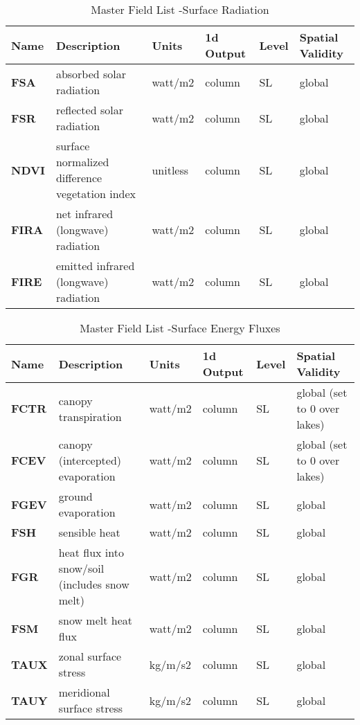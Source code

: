 \begin{longtable}{|l|p{2.3in}|l|l|l|p{1.0in}|} 
\caption{\label{master_field_list_srad} Master Field List -Surface Radiation} \\
\hline
\endhead
\hline
Name & Description & Units & 1d Output & Level & Spatial Validity  \\ 
\hline	\hline	

{\bf FSA} 
& absorbed solar radiation   
& watt/m2        
& column
& SL
& global \\ 
\hline

{\bf FSR} 
& reflected solar radiation   
& watt/m2        
& column  
& SL
& global \\ 
\hline

{\bf NDVI} 
& surface normalized difference vegetation index   
& unitless        
& column  
& SL
& global \\ 
\hline

{\bf FIRA} 
& net infrared (longwave) radiation   
& watt/m2      
& column  
& SL
& global \\ 
\hline

{\bf FIRE} 
& emitted infrared (longwave) radiation   
& watt/m2      
& column
& SL
& global \\ \hline

\end{longtable}
      
\begin{longtable}{|l|p{2.3in}|l|l|l|p{1.0in}|} 
\caption{\label{master_field_list_sflux} Master Field List -Surface Energy Fluxes} \\
\hline
\endhead
\hline
Name & Description & Units & 1d Output & Level & Spatial Validity  \\ 
\hline	\hline	

{\bf FCTR} 
& canopy transpiration   
& watt/m2      
& column  
& SL
& global (set to 0 over lakes) \\
\hline

{\bf FCEV} 
& canopy (intercepted) evaporation   
& watt/m2      
& column  
& SL
& global (set to 0 over lakes) \\
\hline

{\bf FGEV} 
& ground evaporation   
& watt/m2      
& column  
& SL
& global  \\
\hline

{\bf FSH} 
& sensible heat   
& watt/m2      
& column  
& SL
& global \\
\hline

{\bf FGR} 
& heat flux into snow/soil (includes snow melt)   
& watt/m2      
& column  
& SL
& global \\
\hline

{\bf FSM} 
& snow melt heat flux   
& watt/m2      
& column  
& SL
& global \\
\hline

{\bf TAUX} 
& zonal surface stress   
& kg/m/s2      
& column  
& SL
& global \\
\hline

{\bf TAUY} 
& meridional surface stress   
& kg/m/s2      
& column  
& SL
& global \\ 
\hline

\end{longtable}
      
